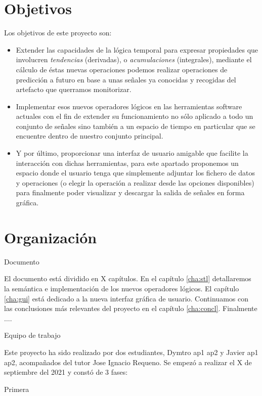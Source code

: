 \section{Objetivos}

Los objetivos de este proyecto son:

\begin{itemize}
\item Extender las capacidades de la lógica temporal para expresar propiedades que involucren \textit{tendencias} (derivadas), o \textit{acumulaciones} (integrales), mediante el cálculo de éstas nuevas operaciones podemos realizar operaciones de predicción a futuro en base a unas señales ya conocidas y recogidas del artefacto que querramos monitorizar.   
\item Implementar esos nuevos operadores lógicos en las herramientas software actuales con el fin de extender su funcionamiento no sólo aplicado a todo un conjunto de señales sino también a un espacio de tiempo en particular que se encuentre dentro de nuestro conjunto principal. 
\item Y por último, proporcionar una interfaz de usuario amigable que facilite la interacción con dichas herramientas, para este apartado  proponemos un espacio donde el usuario tenga que simplemente adjuntar los fichero de datos y operaciones (o elegir la operación a realizar desde las opciones disponibles) para finalmente poder visualizar y descargar la salida de señales en forma gráfica. 
\end{itemize}

\section{Organización}

Documento

El documento está dividido en X capítulos. En el capítulo \ref{cha:stl} detallaremos la semántica e implementación de los nuevos operadores lógicos. El capítulo \ref{cha:gui} está dedicado a la nueva interfaz gráfica de usuario. Continuamos con las conclusiones más relevantes del proyecto en el capítulo \ref{cha:concl}. Finalmente $\ldots$.

Equipo de trabajo 

Este proyecto ha sido realizado por dos estudiantes, Dymtro ap1 ap2 y Javier ap1 ap2, acompañados del tutor Jose Ignacio Requeno. Se empezó a realizar el X de septiembre del 2021 y constó de 3 fases: 

Primera 


